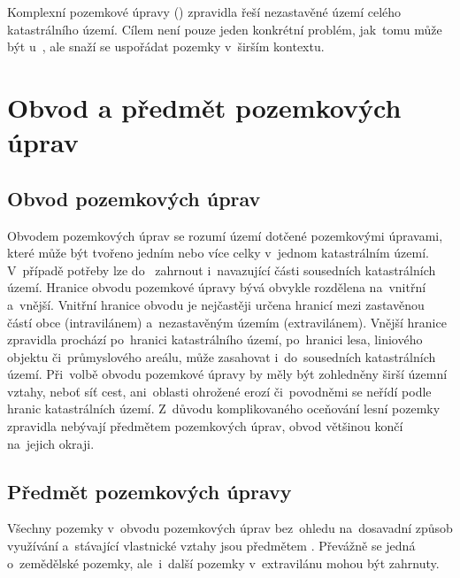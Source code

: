 Komplexní pozemkové úpravy () zpravidla řeší nezastavěné území celého kata\-strálního území. Cílem  není pouze jeden konkrétní problém, jak~tomu může být u~, ale snaží se uspořádat pozemky v~širším kontextu. 

\section{Obvod a předmět pozemkových úprav}
\label{obvod_a_predmet_pu}

\subsection{Obvod pozemkových úprav}
\label{obvod_pu}

Obvodem pozemkových úprav se rozumí území dotčené pozemkovými úpra\-vami, které může být tvořeno jedním nebo více celky v~jednom katastrálním území. V~pří\-padě potřeby lze do~ zahrnout i~navazující části sousedních katastrálních území. Hranice obvodu pozemkové úpravy bývá obvykle rozdělena na~vnitřní a~vnější. Vnitřní hranice obvodu je nejčastěji určena hranicí mezi zastavěnou částí obce (intravilánem) a~nezastavěným územím (extravilánem). Vnější hranice zpravidla pro\-chází po~hranici katastrálního území, po~hranici lesa, liniového objektu či~průmy\-slového areálu, může zasahovat i~do~sousedních katastrálních území. Při~volbě obvodu pozemkové úpravy by měly být zohledněny širší územní vztahy, neboť síť cest, ani~oblasti ohrožené erozí či~povodněmi se neřídí podle hranic katastrálních území. Z~důvodu komplikovaného oceňování lesní pozemky zpravidla nebývají předmětem pozemkových úprav, obvod většinou končí na~jejich okraji.

\subsection{Předmět pozemkových úpravy}
\label{predmet_pu}

Všechny pozemky v~obvodu pozemkových úprav bez~ohledu na~dosavadní způsob využívání a~stávající vlastnické vztahy jsou předmětem . Převážně se jedná o~zemědělské pozemky, ale~i~další pozemky v~extravilánu mohou být zahrnuty.

